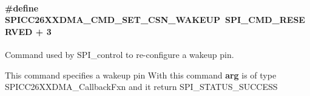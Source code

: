 \paragraph[{S\+P\+I\+C\+C26\+X\+X\+D\+M\+A\+\_\+\+C\+M\+D\+\_\+\+S\+E\+T\+\_\+\+C\+S\+N\+\_\+\+W\+A\+K\+E\+U\+P}]{\setlength{\rightskip}{0pt plus 5cm}\#define S\+P\+I\+C\+C26\+X\+X\+D\+M\+A\+\_\+\+C\+M\+D\+\_\+\+S\+E\+T\+\_\+\+C\+S\+N\+\_\+\+W\+A\+K\+E\+U\+P~{\bf S\+P\+I\+\_\+\+C\+M\+D\+\_\+\+R\+E\+S\+E\+R\+V\+E\+D} + 3}\label{group___s_p_i___c_m_d_gae07fd93964e63fc93795835eaa14b589}


Command used by S\+P\+I\+\_\+control to re-\/configure a wakeup pin. 

This command specifies a wakeup pin With this command {\bfseries arg} is of type {\ttfamily S\+P\+I\+C\+C26\+X\+X\+D\+M\+A\+\_\+\+Callback\+Fxn} and it return S\+P\+I\+\_\+\+S\+T\+A\+T\+U\+S\+\_\+\+S\+U\+C\+C\+E\+S\+S 